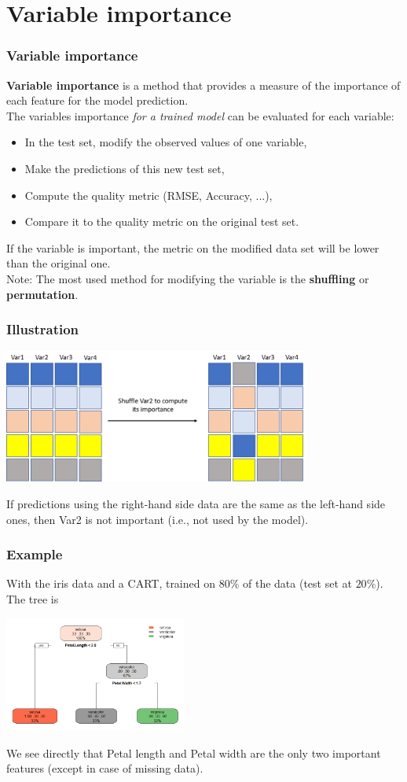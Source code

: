 \section{Variable importance}
\begin{frame}
\frametitle{Variable importance}
{\bf Variable importance} is a method that provides a measure of the importance of each feature for the model prediction.\\
\vspace{0.3cm}
The variables importance {\it for a trained model} can be evaluated for each variable:
\begin{itemize}
\item In the test set, modify the observed values of one variable,
\item Make the predictions of this new test set,
\item Compute the quality metric (RMSE, Accuracy, ...),
\item Compare it to the quality metric on the original test set.
\end{itemize}
If the variable is important, the metric on the modified data set will be lower than the original one. \\
\vspace{0.2cm}
Note: The most used method for modifying the variable is the {\bf shuffling} or {\bf permutation}.
\end{frame}
\begin{frame}
\frametitle{Illustration}
\begin{center}
\includegraphics[width=10cm]{../Graphs/VI_Illustr.png}
\end{center}
If predictions using the right-hand side data are the same as the left-hand side ones, then Var2 is not important (i.e., not used by the model).
\end{frame}
\begin{frame}
\frametitle{Example}
With the iris data and a CART, trained on $80\%$ of the data (test set at $20\%$). The tree is
\begin{center}
\includegraphics[width=6cm]{../Graphs/VarImp_iris_CART.png}
\end{center}
We see directly that Petal length and Petal width are the only two important features (except in case of missing data). 
\end{frame}
